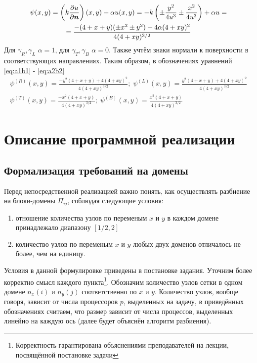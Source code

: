 \documentclass[12pt, fleqn]{article}
\theoremstyle{definition}
\def\vec#1{\mathchoice{\mbox{\boldmath$\displaystyle#1$}}
{\mbox{\boldmath$\textstyle#1$}} {\mbox{\boldmath$\scriptstyle#1$}} {\mbox{\boldmath$\scriptscriptstyle#1$}}}
\begin{document}
\begin{gather*}
 \psi(x, y) = \left(k\frac{\partial u}{\partial \vec{n}}\right)(x, y) + \alpha u(x, y) = -k\left(\pm \frac{y^2}{4u^3} \pm \frac{x^2}{4u^3}\right) + \alpha u = \\
 = \frac{-(4+x+y)(\pm x^2 \pm y^2) + 4\alpha(4+xy)^2}{4(4 + xy)^{3/2}}
\end{gather*}
Для $\gamma_R, \gamma_L$ $\alpha=1$, для $\gamma_T, \gamma_B$ $\alpha=0$. Также учтём знаки нормали к поверхности в соответствующих направлениях.
Таким образом, в обозначениях уравнений \ref{eq:a1b1} - \ref{eq:a2b2}
\begin{gather}
 \psi^{(R)}(x, y) = \frac{-y^2(4+x+y) + 4(4+xy)^2}{4(4 + xy)^{3/2}}; \; \psi^{(L)}(x, y) = \frac{y^2(4+x+y) + 4(4+xy)^2}{4(4 + xy)^{3/2}}  \label{eq:psi_RL} \\
 \psi^{(T)}(x, y) = \frac{-x^2(4+x+y)}{4(4 + xy)^{3/2}};\;
\psi^{(B)}(x, y) = \frac{x^2(4+x+y)}{4(4 + xy)^{3/2}}\label{eq:psi_TB}
\end{gather}

\section{Описание программной реализации}
\subsection{Формализация требований на домены}
Перед непосредственной реализацией важно понять, как осуществлять разбиение на блоки-домены $\Pi_{ij}$, соблюдая следующие условия:
\begin{enumerate}
 \item отношение количества узлов по переменым $x$ и $y$ в каждом домене принадлежало диапазону $[1 / 2,2]$

 \item количество узлов по переменым $x$ и $y$ любых двух доменов отличалось не более, чем на единицу.
\end{enumerate}

Условия в данной формулировке приведены в постановке задания. Уточним более корректно смысл каждого пункта\footnote{Корректность гарантирована объяснениями преподавателей на лекции, посвящённой постановке задачи}.
Обозначим количество узлов сетки в одном домене $n_x(i)$ и $n_y(j)$ соответственно по $x$ и $y$. Количество узлов, вообще говоря, зависит от числа процессоров $p$, выделенных на задачу, в приведённых обозначениях считаем, что размер зависит от числа процессов, выделенных линейно на каждую ось (далее будет объяснён алгоритм разбиения).
\end{document}
